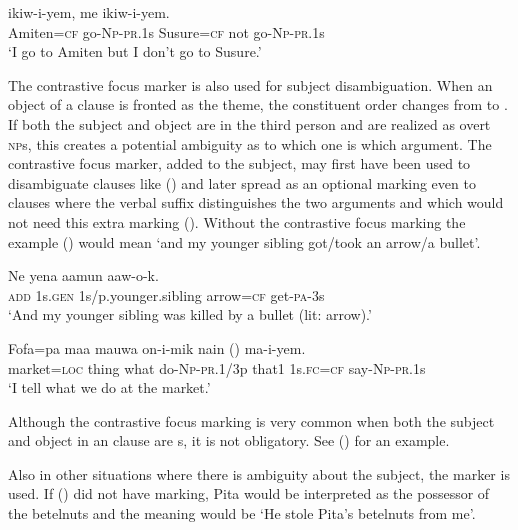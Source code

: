 \ea%
\label{ex:x1694}
\gll {}  ikiw-i-yem,    me  ikiw-i-yem. \\
Amiten=\textsc{cf}  go-\textsc{Np}-\textsc{pr}.1s  Susure=\textsc{cf}  not  go-\textsc{Np}-\textsc{pr}.1s      \\
\glt`I go to Amiten but I don't go to Susure.'
\z


The contrastive focus marker is also used for subject disambiguation. When an object of a clause is fronted as the theme, the constituent order changes from  to . If both the subject and object are in the third person and are realized as overt \textsc{np}s, this creates a potential ambiguity as to which one is which argument. The contrastive focus marker, added to the subject, may first have been used to disambiguate clauses like () and later spread as an optional marking even to clauses where the verbal suffix distinguishes the two arguments and which would not need this extra marking (). Without the contrastive focus marking the example () would mean `and my younger sibling got/took an arrow/a bullet'.

\ea%
\label{ex:x1695}
\gll Ne  yena  aamun    aaw-o-k. \\
\textsc{add}  1s.\textsc{gen}  1s/p.younger.sibling  arrow=\textsc{cf}  get-\textsc{pa}-3s      \\
\glt`And my younger sibling was killed by a bullet (lit: arrow).'
\z


\ea%
\label{ex:x1696}
\gll Fofa=pa  maa  mauwa  on-i-mik  nain  () ma-i-yem. \\
market=\textsc{loc}  thing  what  do-\textsc{Np}-\textsc{pr}.1/3p  that1  1s.\textsc{fc}=\textsc{cf} say-\textsc{Np}-\textsc{pr}.1s     \\
\glt`I tell what we do at the market.' 
\z


Although the contrastive focus marking is very common when both the subject and object in an  clause are s, it is not obligatory. See () for an example.

Also in other situations where there is ambiguity about the subject, the  marker is used. If () did not have  marking, Pita would be interpreted as the possessor of the betelnuts and the meaning would be `He stole Pita's betelnuts from me'.

